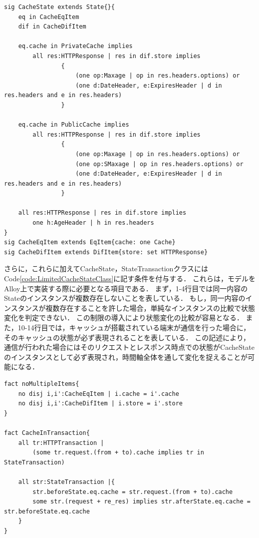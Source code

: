 \documentclass[12pt,a4paper]{jbook}
\begin{document}
\begin{lstlisting}[caption=キャッシュの状態を表すクラス, label=code:CacheStateClass]
sig CacheState extends State{}{
	eq in CacheEqItem
	dif in CacheDifItem

	eq.cache in PrivateCache implies
        all res:HTTPResponse | res in dif.store implies
                {
                    (one op:Maxage | op in res.headers.options) or
                    (one d:DateHeader, e:ExpiresHeader | d in res.headers and e in res.headers)
                }

    eq.cache in PublicCache implies
        all res:HTTPResponse | res in dif.store implies
                {
                    (one op:Maxage | op in res.headers.options) or
                    (one op:SMaxage | op in res.headers.options) or
                    (one d:DateHeader, e:ExpiresHeader | d in res.headers and e in res.headers)
                }

    all res:HTTPResponse | res in dif.store implies
        one h:AgeHeader | h in res.headers
}
sig CacheEqItem extends EqItem{cache: one Cache}
sig CacheDifItem extends DifItem{store: set HTTPResponse}
\end{lstlisting}

さらに，これらに加えてCacheState，StateTransactionクラスにはCode\ref{code:LimitedCacheStateClass}に記す条件を付与する．
これらは，モデルをAlloy上で実装する際に必要となる項目である．
まず，1-4行目では同一内容のStateのインスタンスが複数存在しないことを表している．
もし，同一内容のインスタンスが複数存在することを許した場合，単純なインスタンスの比較で状態変化を判定できない．
この制限の導入により状態変化の比較が容易となる．
また，10-14行目では，キャッシュが搭載されている端末が通信を行った場合に，そのキャッシュの状態が必ず表現されることを表している．
この記述により，通信が行われた場合にはそのリクエストとレスポンス時点での状態がCacheStateのインスタンスとして必ず表現され，時間軸全体を通して変化を捉えることが可能になる．
\begin{lstlisting}[caption=CacheStateクラスの制限, label=code:LimitedCacheStateClass]
fact noMultipleItems{
	no disj i,i':CacheEqItem | i.cache = i'.cache
	no disj i,i':CacheDifItem | i.store = i'.store
}

fact CacheInTransaction{
	all tr:HTTPTransaction |
		(some tr.request.(from + to).cache implies tr in StateTransaction)

	all str:StateTransaction |{
		str.beforeState.eq.cache = str.request.(from + to).cache
		some str.(request + re_res) implies str.afterState.eq.cache = str.beforeState.eq.cache
	}
}
\end{lstlisting}
\end{document}
